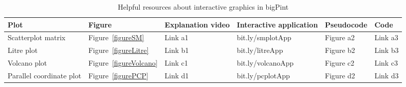 \documentclass[parskip=full]{bmcart} %
\begin{document}
\begin{backmatter}
\begin{table}[h]
\caption{Helpful resources about interactive graphics in bigPint}
      \begin{tabular}{llllll}
        \hline
        Plot & Figure & Explanation video & Interactive application & Pseudocode & Code\\ \hline
        Scatterplot matrix & Figure~\ref{figureSM} & Link a1 & bit.ly/smplotApp & Figure a2 & Link a3\\
        Litre plot & Figure~\ref{figureLitre} & Link b1 & bit.ly/litreApp & Figure b2 & Link b3\\
        Volcano plot & Figure~\ref{figureVolcano} & Link c1 & bit.ly/volcanoApp & Figure c2 & Link c3\\
        Parallel coordinate plot & Figure~\ref{figurePCP} & Link d1 & bit.ly/pcplotApp & Figure d2 & Link d3\\ \hline
      \end{tabular}
      \label{table:table2}
\end{table}











\clearpage


\DontPrintSemicolon
\begin{algorithm}[H]
\SetAlgoLined
{}


\end{algorithm}
\end{backmatter}
\end{document}
